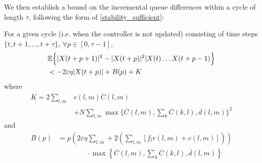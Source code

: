 \label{cycleproof}
We then establish a bound on the incremental queue differences within a cycle of length $\tau$, following the form of \eqref{stability_sufficient}: 
\begin{Lem} \label{lemma_p} 
For a given cycle (i.e. when the controller is not updated) consisting of time steps $\{t, t+1, \ldots,  t+\tau\}$,  $\forall p \in [0, \tau - 1 ]$, 
\begin{align} \nonumber 
&\expectation{\vert X(t + p + 1)\vert^2 - \vert X(t + p)\vert^2 \vert X(t) \ldots X(t + p - 1)} \\
&< -2\varepsilon \eta \vert X(t + p )\vert + B(p) + K \label{boundCycleMP}
\end{align}
where
\begin{align}  \label{Kdef}
K = 2 \sum_{l,m}&c(l,m)\overline{C}(l,m) \\ \nonumber 
& + N \sum_{l,m} \max\{ \overline{C}(l,m),\sum_{k}\overline{C}(k,l), \overline{d}(l,m) \} ^2
\end{align}
and
\begin{align} \nonumber 
B(p) &= p\left(2\varepsilon \eta  \sum_{l,m} + 2  (\sum_{l,m}[f_{l}r(l,m) + c(l,m)]) \right) \\
& \qquad \qquad \cdot \max\left\{ \overline{C}(l,m),\sum_{k}\overline{C}(k,l),\overline d(l,m) \right\} \label{Cpdef}
\end{align}
\end{Lem}




